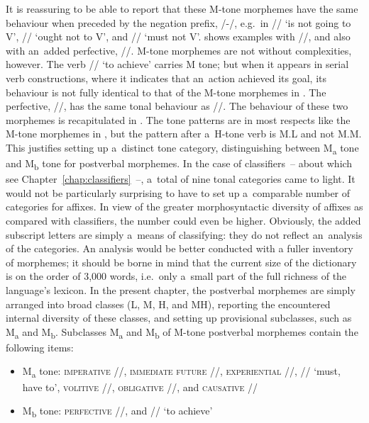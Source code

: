 \largerpage[-1]  %
It is reassuring to be able to report that these M-tone morphemes have the same behaviour when preceded by the {negation} prefix,
/-/, e.g.~in // ‘is not going to V’, // ‘ought not to V’, and
// ‘must not V’.  shows examples with //, and also with
an~added {perfective}, \mbox{//}. M-tone morphemes are not without complexities, however. The verb // ‘to achieve’ carries M tone; but when it appears in serial verb
constructions, where it indicates that an~action achieved its goal, its behaviour is not fully identical to that
of the M-tone morphemes in . The {perfective}, \mbox{//}, has the same tonal behaviour as //. The behaviour of these two morphemes is recapitulated in . The tone patterns are in most
respects like the M-tone morphemes in , but the pattern after a~H-tone verb is
M.L and not M.M. This justifies setting up a~distinct tone category, distinguishing between M\textsubscript{a} tone and M\textsubscript{b} tone for postverbal morphemes. In the case of classifiers~-- about which see Chapter~\ref{chap:classifiers}~--, a~total of nine tonal categories came to light. It would not be particularly surprising to have to set up a~comparable number of categories for affixes. In view of the greater morphosyntactic diversity of affixes as compared with classifiers, the number could even be higher. Obviously, the added subscript letters are simply a~means of classifying: they do not reflect an~analysis of the categories. An analysis would be better conducted with a fuller
inventory of morphemes; it should be borne in mind that the current size of the dictionary \citep{michauddict2015} is on the order of 3,000 words, i.e.\ only a~small part of the full richness of the language's lexicon. In the present chapter, the postverbal morphemes are simply arranged into broad classes (L, M, H, and MH), reporting the encountered internal diversity of these classes, and setting up provisional subclasses, such as M\textsubscript{a} and M\textsubscript{b}. Subclasses M\textsubscript{a} and M\textsubscript{b} of M-tone postverbal morphemes contain the following items: 

\begin{itemize}
	\item{M\textsubscript{a} tone: \textsc{imperative} //, \textsc{immediate future} //, \textsc{experiential}\Hack{\break} //, // ‘must, have to’, \textsc{volitive} //, \textsc{obligative}
		//, and \textsc{causative} //}
	\item{M\textsubscript{b} tone: \textsc{perfective} //, and // ‘to achieve’}
\end{itemize}

